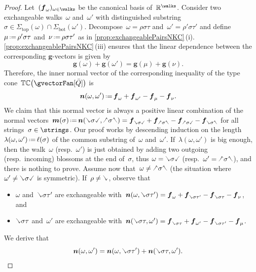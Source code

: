 \documentclass{amsart}
\theoremstyle{definition}
\newcommand{\R}{\mathbb{R}} %
\renewcommand{\b}[1]{{\boldsymbol{#1}}} %
\newcommand{\eqdef}{\mbox{\,\raisebox{0.2ex}{\scriptsize\ensuremath{\mathrm:}}\ensuremath{=}\,}} %
\newcommand{\gvector}[1]{\b{g}(#1)} %
\newcommand{\typeCone}{\mathbb{TC}} %
\newcommand{\quiver}{\bar Q} %
\renewcommand{\top}{\mathrm{top}} %
\newcommand{\bottom}{\mathrm{bot}} %
\newcommand{\hL}{\text{\rotatebox[origin=c]{180}{\checked}}}
\newcommand{\hR}{\text{\rotatebox[origin=c]{180}{\reflectbox{\checked}}}}
\newcommand{\cL}{\text{\reflectbox{\checked}}}
\newcommand{\cR}{\text{\checked}}
\newcommand{\hh}[1]{\hL#1\hR} %
\newcommand{\cc}[1]{\cL#1\cR} %
\newcommand{\hc}[1]{\hL#1\cR} %
\newcommand{\ch}[1]{\cL#1\hR} %
\begin{document}
\begin{proof}
Let~$(\b{f}_\omega)_{\omega \in \walks}$ be the canonical basis of~$\R^{\walks}$.
Consider two exchangeable walks~$\omega$ and~$\omega'$ with distinguished substring~$\sigma \in \Sigma_\top(\omega) \cap \Sigma_\bottom(\omega')$.
Decompose~$\omega = \rho \sigma \tau$ and~$\omega' = \rho' \sigma \tau'$ and define~$\mu \eqdef \rho' \sigma \tau$ and~$\nu \eqdef \rho \sigma \tau'$ as in \cref{prop:exchangeablePairsNKC}\,(i). \cref{prop:exchangeablePairsNKC}\,(iii) ensures that the linear dependence between the corresponding $\b{g}$-vectors is given by
\[
\gvector{\omega} + \gvector{\omega'} = \gvector{\mu} + \gvector{\nu}.
\]
Therefore, the inner normal vector of the corresponding inequality of the type cone~$\typeCone \big( \gvectorFan[\quiver] \big)$ is
\[
\b{n}(\omega, \omega') \eqdef \b{f}_\omega + \b{f}_{\omega'} - \b{f}_\mu - \b{f}_\nu.
\]
We claim that this normal vector is always a positive linear combination of the normal vectors~$\b{m}(\sigma) \eqdef \b{n}(\cc{\sigma}, \hh{\sigma}) = \b{f}_{\cc{\sigma}} + \b{f}_{\hh{\sigma}} - \b{f}_{\hc{\sigma}} - \b{f}_{\ch{\sigma}}$ for all strings~$\sigma \in \strings$.
Our proof works by descending induction on the length~$\lambda(\omega,\omega') \eqdef \ell(\sigma)$ of the common substring of~$\omega$ and~$\omega'$.
If~$\lambda(\omega, \omega')$ is big enough, then the walk~$\omega$ (resp.~$\omega'$) is just obtained by adding two outgoing (resp.~incoming) blossoms at the end of~$\sigma$, thus $\omega = \cc{\sigma}$ (resp.~$\omega' = \hh{\sigma}$), and there is nothing to prove.
Assume now that~$\omega \ne \hh{\sigma}$ (the situation where~$\omega' \ne \cc{\sigma}$ is symmetric).
If~$\rho \ne \cL$, observe that
\begin{itemize}
\item $\omega$ and~$\cL \sigma \tau'$ are exchangeable with~$\b{n}(\omega, \cL \sigma \tau') = \b{f}_\omega + \b{f}_{\cL \sigma \tau'} - \b{f}_{\cL \sigma \tau} - \b{f}_\nu$, and
\item $\cL \sigma \tau$ and~$\omega'$ are exchangeable with~$\b{n}(\cL \sigma \tau, \omega') = \b{f}_{\cL \sigma \tau} + \b{f}_{\omega'} - \b{f}_{\cL \sigma \tau'} - \b{f}_\mu$.
\end{itemize}
We derive that
\[
\b{n}(\omega, \omega') = \b{n}(\omega, \cL \sigma \tau') + \b{n}(\cL \sigma \tau, \omega').
\]


\end{proof}
\end{document}
